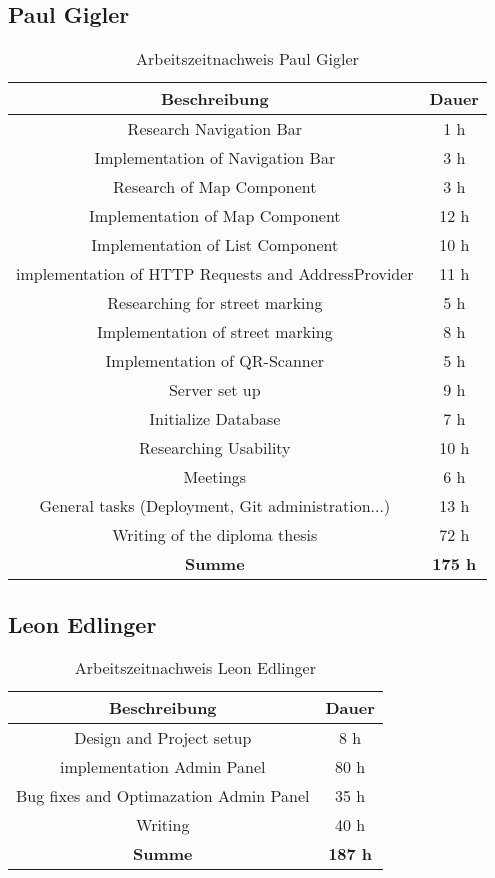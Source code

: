 \subsection{Paul Gigler}

\begin{table}[H]
  \centering
  \begin{tabular}{|c|c|}
  \hline
  \multicolumn{1}{|c|}{\textbf{Beschreibung}}  &
  \multicolumn{1}{c|}{\textbf{Dauer}}  \\ \hline
    Research Navigation Bar & 1 h \\ \hline
    Implementation of Navigation Bar & 3 h \\ \hline
    Research of Map Component & 3 h \\ \hline
    Implementation of Map Component & 12 h \\ \hline
    Implementation of List Component & 10 h \\ \hline
    implementation of HTTP Requests and AddressProvider & 11 h \\ \hline
    Researching for street marking & 5 h \\ \hline
    Implementation of street marking & 8 h \\ \hline
    Implementation of QR-Scanner & 5 h \\ \hline
    Server set up & 9 h \\ \hline
    Initialize Database & 7 h \\ \hline
    Researching Usability & 10 h \\ \hline
    Meetings & 6 h \\ \hline
    General tasks (Deployment, Git administration...) & 13 h \\ \hline
    Writing of the diploma thesis & 72 h \\ \hline
    {\textbf{Summe}} & \textbf{175 h} \\ \hline
   \end{tabular}
  \caption{Arbeitszeitnachweis Paul Gigler}
  \end{table}

  \subsection{Leon Edlinger}

\begin{table}[H]
  \centering
\begin{tabular}{|c|c|}
\hline
\multicolumn{1}{|c|}{\textbf{Beschreibung}}  &
\multicolumn{1}{c|}{\textbf{Dauer}}  \\ \hline
  Design and Project setup & 8 h \\ \hline
  implementation Admin Panel & 80 h \\ \hline
  Bug fixes and Optimazation Admin Panel & 35 h \\ \hline
  Writing & 40 h \\ \hline
  {\textbf{Summe}} & \textbf{187 h} \\ \hline
 \end{tabular}
\caption{Arbeitszeitnachweis Leon Edlinger}
\end{table}

